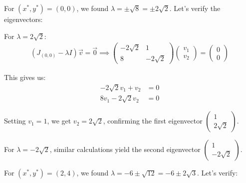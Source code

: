 \documentclass[12pt]{article}
\begin{document}
For $(x^*,y^*) = (0,0)$, we found $\lambda = \pm\sqrt{8} = \pm 2\sqrt{2}$.
Let's verify the eigenvectors:

For $\lambda = 2\sqrt{2}$:
\begin{align*}
    (J_{(0,0)} - \lambda I)\vec{v} = \vec{0} \implies \begin{pmatrix}
                                                          -2\sqrt{2} & 1          \\
                                                          8          & -2\sqrt{2}
                                                      \end{pmatrix}\begin{pmatrix}
                                                                       v_1 \\ v_2
                                                                   \end{pmatrix} = \begin{pmatrix}
                                                                                       0 \\ 0
                                                                                   \end{pmatrix}
\end{align*}

This gives us:
\begin{align*}
    -2\sqrt{2}v_1 + v_2 & = 0 \\
    8v_1 - 2\sqrt{2}v_2 & = 0
\end{align*}

Setting $v_1 = 1$, we get $v_2 = 2\sqrt{2}$, confirming the first eigenvector $\begin{pmatrix} 1 \\ 2\sqrt{2} \end{pmatrix}$.

For $\lambda = -2\sqrt{2}$, similar calculations yield the second eigenvector $\begin{pmatrix} 1 \\ -2\sqrt{2} \end{pmatrix}$.

For $(x^*,y^*) = (2,4)$, we found $\lambda = -6 \pm \sqrt{12} = -6 \pm
    2\sqrt{3}$. Let's verify:
\end{document}
